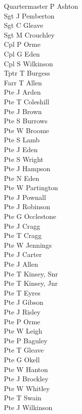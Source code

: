\begin{multicols}{2}
  \noindent
  Quartermaster P Ashton \\
  Sgt J Pemberton \\
  Sgt C Gleave \\
  Sgt M Crouchley \\
  Cpl P Orme \\
  Cpl G Eden \\
  Cpl S Wilkinson \\
  Tptr T Burgess \\
  Farr T Allen \\
  Pte J Arden \\
  Pte T Coleshill \\
  Pte J Brown \\
  Pte S Burrows \\
  Pte W Broome \\
  Pte S Lamb \\
  Pte J Eden \\
  Pte S Wright \\
  Pte J Hampson \\
  Pte N Eden \\
  Pte W Partington \\
  Pte J Pownall \\
  Pte J Robinson \\
  Pte G Occlestone \\
  Pte J Cragg \\
  Pte T Cragg \\
  Pte W Jennings \\
  Pte J Carter \\
  Pte J Allen \\
  Pte T Kinsey, Snr \\
  Pte T Kinsey, Jnr \\
  Pte T Eyres \\
  Pte J Gibson \\
  Pte J Risley \\
  Pte P Orme \\
  Pte W Leigh \\
  Pte P Baguley \\
  Pte T Gleave \\
  Pte G Okell \\
  Pte W Hanton \\
  Pte J Brockley \\
  Pte W Whitley \\
  Pte T Swain \\
  Pte J Wilkinson \\

\end{multicols}
